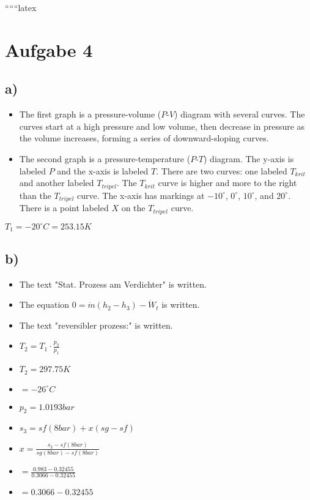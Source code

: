 
``````latex


\section*{Aufgabe 4}

\subsection*{a)}

\begin{itemize}
    \item The first graph is a pressure-volume ($P$-$V$) diagram with several curves. The curves start at a high pressure and low volume, then decrease in pressure as the volume increases, forming a series of downward-sloping curves.
    \item The second graph is a pressure-temperature ($P$-$T$) diagram. The y-axis is labeled $P$ and the x-axis is labeled $T$. There are two curves: one labeled $T_{krit}$ and another labeled $T_{tripel}$. The $T_{krit}$ curve is higher and more to the right than the $T_{tripel}$ curve. The x-axis has markings at $-10^\circ$, $0^\circ$, $10^\circ$, and $20^\circ$. There is a point labeled $X$ on the $T_{tripel}$ curve.
\end{itemize}

$T_1 = -20^\circ C = 253.15K$

\subsection*{b)}

\begin{itemize}
    \item The text "Stat. Prozess am Verdichter" is written.
    \item The equation $0 = \dot{m}(h_2 - h_3) - \dot{W}_t$ is written.
    \item The text "reversibler prozess:" is written.
    \item $T_2 = T_1 \cdot \frac{p_2}{p_1}$
    \item $T_2 = 297.75K$
    \item $= -26^\circ C$
    \item $p_2 = 1.0193bar$
    \item $s_3 = sf(8bar) + x(sg - sf)$
    \item $x = \frac{s_3 - sf(8bar)}{sg(8bar) - sf(8bar)}$
    \item $= \frac{0.983 - 0.32455}{0.3066 - 0.32455}$
    \item $= 0.3066 - 0.32455$
\end{itemize}

